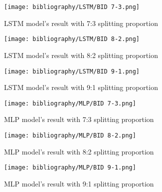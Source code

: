 \documentclass{ieeeojies}
\begin{document}
\begin{figure}[H]
  \centering
  \begin{minipage}{0.8\linewidth}
    \centering
    \texttt{[image: bibliography/LSTM/BID 7-3.png]}
    \caption{LSTM model's result with 7:3 splitting proportion}
    \label{fig8}
  \end{minipage}
\end{figure}

\begin{figure}[H]
  \centering
  \begin{minipage}{0.8\linewidth}
    \centering
    \texttt{[image: bibliography/LSTM/BID 8-2.png]}
    \caption{LSTM model's result with 8:2 splitting proportion}
    \label{fig8}
  \end{minipage}
\end{figure}

\begin{figure}[H]
  \centering
  \begin{minipage}{0.8\linewidth}
    \centering
    \texttt{[image: bibliography/LSTM/BID 9-1.png]}
    \caption{LSTM model's result with 9:1 splitting proportion}
    \label{fig8}
  \end{minipage}
\end{figure}


\begin{figure}[H]
  \centering
  \begin{minipage}{0.8\linewidth}
    \centering
    \texttt{[image: bibliography/MLP/BID 7-3.png]}
    \caption{MLP model's result with 7:3 splitting proportion}
    \label{fig8}
  \end{minipage}
\end{figure}

\begin{figure}[H]
  \centering
  \begin{minipage}{0.8\linewidth}
    \centering
    \texttt{[image: bibliography/MLP/BID 8-2.png]}
    \caption{MLP model's result with 8:2 splitting proportion}
    \label{fig8}
  \end{minipage}
\end{figure}

\begin{figure}[H]
  \centering
  \begin{minipage}{0.8\linewidth}
    \centering
    \texttt{[image: bibliography/MLP/BID 9-1.png]}
    \caption{MLP model's result with 9:1 splitting proportion}
    \label{fig8}
  \end{minipage}
\end{figure}
\end{document}
